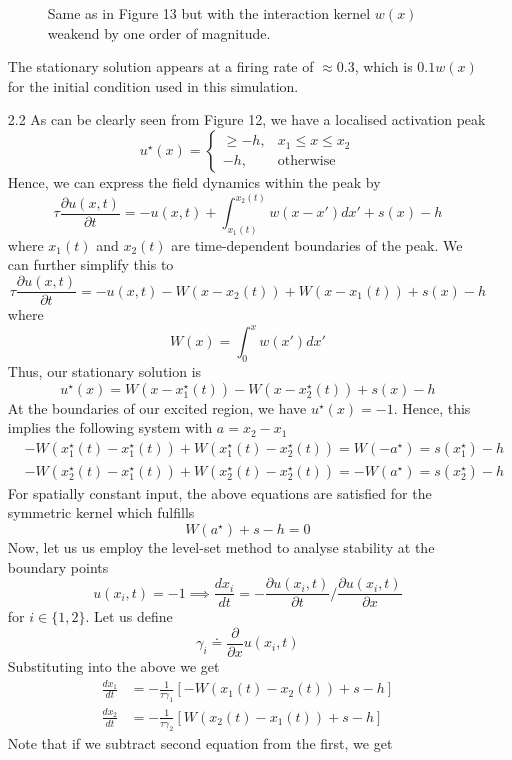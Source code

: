 \documentclass[12pt]{article}
\begin{document}
\begin{enumerate}
\begin{figure}[H]
    \caption{Same as in Figure 13 but with the interaction kernel $w(x)$ weakend by one order of magnitude.}
\end{figure}
The stationary solution appears at a firing rate of $\approx 0.3$, which is $0.1w(x)$ for the initial condition 
used in this simulation.
\item[2.2] As can be clearly seen from Figure 12, we have a localised activation peak
\[
    u^{\star}(x)=\begin{cases}
                \geq -h, & x_{1} \leq x \leq x_{2}\\
                -h, & \text{otherwise}
            \end{cases} 
\] 
Hence, we can express the field dynamics within the peak by
\[
    \tau \frac{\partial u(x, t)}{\partial t} = -u(x, t) + \int_{x_{1}(t)}^{x_{2}(t)}w(x-x')dx' + s(x) - h
\]
where $x_{1}(t)$ and $x_{2}(t)$ are time-dependent boundaries of the peak. We can further simplify this to
\[
    \tau \frac{\partial u(x, t)}{\partial t} = -u(x, t) - W(x-x_{2}(t)) + W(x-x_{1}(t)) + s(x) - h
\]
where 
\[
    W(x) = \int_{0}^{x}w(x')dx'
\]
Thus, our stationary solution is
\[
    u^{\star}(x) = W(x-x_{1}^{\star}(t)) - W(x-x_{2}^{\star}(t)) + s(x) - h
\]
At the boundaries of our excited region, we have $u^{\star}(x) = -1$. Hence, this implies the following system with $a=x_{2}-x_{1}$
\begin{align*}
   &- W(x_{1}^{\star}(t)-x_{1}^{\star}(t)) + W(x_{1}^{\star}(t)-x_{2}^{\star}(t)) = W(-a^{\star}) = s(x_{1}^{\star})-h\\
   &- W(x_{2}^{\star}(t)-x_{1}^{\star}(t)) + W(x_{2}^{\star}(t)-x_{2}^{\star}(t)) = -W(a^{\star}) = s(x_{2}^{\star})-h
\end{align*}
For spatially constant input, the above equations are satisfied for the symmetric kernel which fulfills
\[
    W(a^{\star}) + s -h = 0
\]
Now, let us us employ the level-set method to analyse stability at the boundary points
\[
    u(x_{i}, t)=-1 \implies \frac{dx_{i}}{dt} = -\frac{\partial u(x_{i}, t)}{\partial t}/ \frac{\partial u(x_{i}, t)}{\partial x}  
\]
for $i \in \{1, 2\}$. Let us define
\[
 \gamma_{i} \doteq \frac{\partial}{\partial x} u(x_{i}, t)
\]
Substituting into the above we get
\begin{align*}
    \frac{dx_{1}}{dt} &= -\frac{1}{\tau \gamma_{1}}[-W(x_{1}(t)-x_{2}(t)) + s -h]\\
    \frac{dx_{2}}{dt} &= -\frac{1}{\tau \gamma_{2}}[W(x_{2}(t)-x_{1}(t)) + s -h]  
\end{align*}
Note that if we subtract second equation from the first, we get

\end{enumerate}
\end{document}
